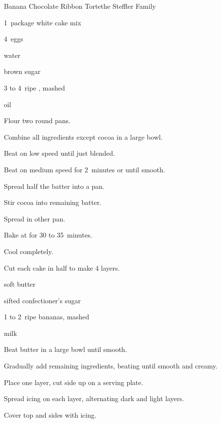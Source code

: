 \begin{recipe}{Banana Chocolate Ribbon Torte}{the Steffler Family}{}

\begin{ingredients}
\item 1~package white cake mix
\item 4~eggs
\item \C{\half} water
\item \C{\quarter} 
\item {} brown sugar
\item 3 to 4~ripe , mashed
\item \C{\third} oil
\end{ingredients}

\begin{directions}
\item Flour two round pans.
\item Combine all ingredients except cocoa in a large bowl.
\item Beat on low speed until just blended.
\item Beat on medium speed for 2~minutes or until smooth.
\item Spread half the batter into a pan.
\item Stir cocoa into remaining batter.
\item Spread in other pan.
\item Bake at  for 30 to 35~minutes.
\item Cool completely.
\item Cut each cake in half to make 4 layers.
\end{directions}


\begin{ingredients}
\item \C{\half} soft butter
\item {} sifted confectioner's sugar
\item 1 to 2~ripe bananas, mashed 
\item {} milk
\end{ingredients}

\begin{directions}
\item Beat butter in a large bowl until smooth.
\item Gradually add remaining ingredients, beating until smooth and creamy.
\item Place one layer, cut side up on a serving plate.
\item Spread icing on each layer, alternating dark and light layers.
\item Cover top and sides with icing.
\end{directions}
\end{recipe}
